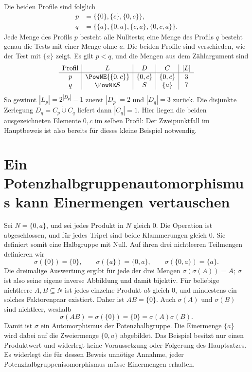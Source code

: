 Die beiden Profile sind folglich
\[
\begin{aligned}
 p&=\{\{0\},\{c\},\{0,c\}\},\\
 q&=\{\{a\},\{0,a\},\{c,a\},\{0,c,a\}\}.
\end{aligned}
\]
Jede Menge des Profils \(p\) besteht alle Nulltests; eine Menge des
Profils \(q\) besteht genau die Tests mit einer Menge ohne \(a\).
Die beiden Profile sind verschieden, wie der Test mit \(\{a\}\)
zeigt. Es gilt \(p<q\), und die Mengen aus dem Zählargument sind
\[
\begin{array}{c|c|c|c|c}
 \text{Profil}&L&D&C&|L|\\\hline
 p&\PowNE{\{0,c\}}&\{0,c\}&\{0,c\}&3\\
 q&\PowNE S&S&\{a\}&7
\end{array}
\]
So gewinnt \(|L_p|=2^{|D_p|}-1\) zuerst \(|D_p|=2\) und
\(|D_q|=3\) zurück. Die disjunkte Zerlegung
\(D_q=C_p\mathbin{\dot\cup}C_q\) liefert dann \(|C_q|=1\).
Hier liegen die beiden ausgezeichneten Elemente \(0,c\) im selben
Profil: Der Zweipunktfall im Hauptbeweis ist also bereits für dieses
kleine Beispiel notwendig.

\section{Ein Potenzhalbgruppenautomorphismus kann Einermengen vertauschen}
\hypertarget{nullproducts.example.singletons}{}

Sei \(N=\{0,a\}\), und sei jedes Produkt in \(N\) gleich \(0\).
Die Operation ist abgeschlossen, und für jedes Tripel sind beide
Klammerungen gleich \(0\). Sie definiert somit eine Halbgruppe mit Null.
Auf ihren drei nichtleeren Teilmengen definieren wir
\[
 \sigma(\{0\})=\{0\},\qquad
 \sigma(\{a\})=\{0,a\},\qquad
 \sigma(\{0,a\})=\{a\}.
\]
Die dreimalige Auswertung ergibt für jede der drei Mengen
\(\sigma(\sigma(A))=A\); \(\sigma\) ist also seine eigene inverse
Abbildung und damit bijektiv. Für beliebige nichtleere \(A,B\subseteq N\)
ist jedes einzelne Produkt \(ab\) gleich \(0\), und mindestens ein
solches Faktorenpaar existiert. Daher ist \(AB=\{0\}\). Auch
\(\sigma(A)\) und \(\sigma(B)\) sind nichtleer, weshalb
\[
 \sigma(AB)=\sigma(\{0\})=\{0\}=\sigma(A)\sigma(B).
\]
Damit ist \(\sigma\) ein Automorphismus der Potenzhalbgruppe. Die
Einermenge \(\{a\}\) wird dabei auf die Zweiermenge \(\{0,a\}\)
abgebildet. Das Beispiel besitzt nur einen Produktwert und widerlegt keine
Voraussetzung oder Folgerung des Hauptsatzes. Es widerlegt die für dessen
Beweis unnötige Annahme, jeder Potenzhalbgruppenisomorphismus müsse
Einermengen erhalten.

